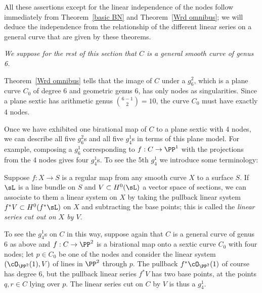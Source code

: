 All these assertions except for the linear independence of the nodes follow immediately from 
Theorem~\ref{basic BN} and
Theorem~\ref{Wrd omnibus}; we will deduce the independence from the relationship of the different
linear series on a general curve that are given by these theorems.


\emph{We suppose for the rest of this section that $C$ is a general smooth curve of genus 6.}

Theorem~\ref{Wrd omnibus} tells that the image of $C$ under a $g^{2}_{6}$, which is a plane curve $C_{0}$ of degree 6 and
geometric genus 6, has only nodes
as singularities. Since a plane sextic has arithmetic genus $\binom{6-1}{2} = 10$, the curve $C_{0}$
must have exactly 4 nodes.

Once we have exhibited one birational map of $C$ to a plane sextic with 4 nodes, we can describe all five $g^2_6$s and all five $g^1_4$s in terms of this plane model. For example, composing a $g^1_6$ corresponding to $f: C\to \PP^1$ with the projections from the 4 nodes gives four $g^1_4$s. To see the 5th $g^{1}_{4}$ we introduce some terminology:

Suppose $f : X \to S$ is a regular map from any smooth curve $X$ to a surface $S$. If $\sL $ is a line bundle on $S$ and $V \subset H^0(\sL )$ a vector space of sections, we can associate to them a linear system on $X$ by taking the pullback linear system $f^*V \subset H^0(f^*\sL )$ on $X$ and subtracting the base points; this is called the \emph{linear series cut out on $X$ by $V$}. 

To see the $g^{1}_{4}$s on $C$ in this way,  suppose again that $C$ is a general curve of genus 6 as above and $f : C \to \PP^2$ is a birational map onto a sextic curve $C_0$ with four nodes; let $p \in C_0$ be one of the nodes and consider the linear system $(\cO_{\PP^2}(1),V)$ of lines in $\PP^2$ through $p$. The pullback $f^*\cO_{\PP^2}(1)$ of course has degree 6, but the pullback linear series $f^*V$ has two base points, at the points $q, r \in C$ lying over $p$. The linear series cut on $C$ by $V$ is thus a $g^1_4$. 

